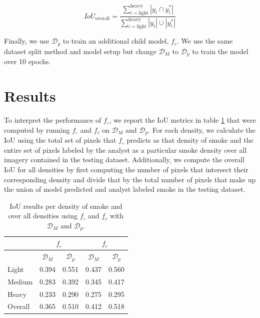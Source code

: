 \documentclass{article}
\begin{document}
\begin{equation} \label{overall_iou}
    IoU_{\text{overall}} = \frac{\sum\limits_{i=\text{light}}^{\text{heavy}}|y_{i}\cap y^*_{i}|}{\sum\limits_{i=\text{light}}^{\text{heavy}}|y_{i}|\cup|y^*_{i}|}
\end{equation}

Finally, we use \(\mathcal{D}_{p}\) to train an additional child model, \(f_c\). We use the same dataset split method and model setup but change \(\mathcal{D}_M\) to \(\mathcal{D}_{p}\) to train the model over 10 epochs.

\section*{Results}

To interpret the performance of \(f_{\circ}\), we report the IoU metrics in table \ref{iou_results} that were computed by running \(f_{\circ}\) and \(f_c\) on \(\mathcal{D}_M\) and \(\mathcal{D}_{p}\). For each density, we calculate the IoU using the total set of pixels that \(f_{\circ}\) predicts as that density of smoke and the entire set of pixels labeled by the analyst as a particular smoke density over all imagery contained in the testing dataset. Additionally, we compute the overall IoU for all densities by first computing the number of pixels that intersect their corresponding density and divide that by the total number of pixels that make up the union of model predicted and analyst labeled smoke in the testing dataset.


\begin{table} 
    \caption{IoU results per density of smoke and over all densities using \(f_{\circ}\) and \(f_c\) with \(\mathcal{D}_M\) and \(\mathcal{D}_p\).}\label{iou_results}
    \centering
    \begin{tabular}{lcc|cc}
        \toprule
        \multicolumn{1}{c}{} & \multicolumn{2}{c}{\(f_{\circ}\)} & \multicolumn{2}{c}{\(f_c\)}\\
        \midrule
        \multicolumn{1}{c}{} & \(\mathcal{D}_M\) & \(\mathcal{D}_{p}\) & \(\mathcal{D}_M\) & \(\mathcal{D}_{p}\) \\
        \midrule
        Light  & 0.394 &  0.551 & 0.437 &  0.560 \\
        Medium & 0.283 &  0.392 & 0.345 &  0.417 \\
        Heavy  & 0.233 &  0.290 & 0.275 &  0.295 \\
        Overall & 0.365 &  0.510 & 0.412 &  0.518 \\
        \bottomrule
    \end{tabular}
\end{table}
\end{document}
